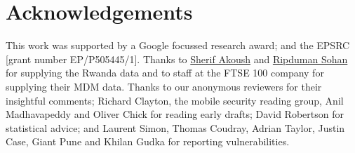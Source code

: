 \documentclass{sig-alternate-2013}
\newcommand{\identifying}[1]{#1}%
\begin{document}
\section*{Acknowledgements}
\identifying{
This work was supported by a Google focussed research award; and the EPSRC [grant number EP/P505445/1].
Thanks to \href{https://www.cl.cam.ac.uk/~sa497/}{Sherif Akoush} and \href{http://orcid.org/0000-0003-0740-8650}{Ripduman Sohan} for supplying the Rwanda data and to staff at the FTSE 100 company for supplying their MDM data.
Thanks to our anonymous reviewers for their insightful comments; Richard Clayton, the mobile security reading group, Anil Madhavapeddy and Oliver Chick for reading early drafts;
David Robertson for statistical advice;
and Laurent Simon, Thomas Coudray, Adrian Taylor, Justin Case, Giant Pune and Khilan Gudka for reporting vulnerabilities.
}
\sloppy
\printbibliography
\end{document}
